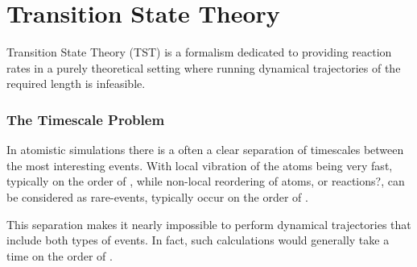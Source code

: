 \section{Transition State Theory}
\label{sec:tst}

Transition State Theory (TST) is a formalism dedicated to providing reaction rates in a purely theoretical setting where running dynamical trajectories of the required length is infeasible.

\subsubsection{The Timescale Problem}
In atomistic simulations there is a often a clear separation of timescales between the most interesting events.
With local vibration of the atoms being very fast, typically on the order of \missing,
while non-local reordering of atoms, or reactions?, can be considered as rare-events, typically occur on the order of \missing.

This separation makes it nearly impossible to perform dynamical trajectories that include both types of events.
In fact, such calculations would generally take a time on the order of \missing.



\placeholder
